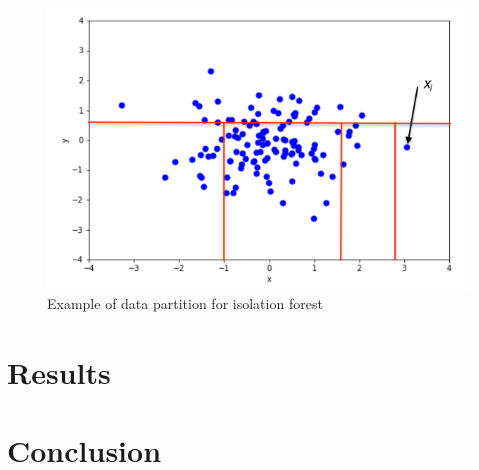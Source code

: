 \documentclass{article}
\begin{document}
\begin{figure}[ht]
    \centering
    \includegraphics[width=.7\textwidth]{../Isolating_an_Anomalous_Point.png}
    \caption{Example of data partition for isolation forest}
    \label{fig:iso_fig}
\end{figure}

\section{Results}


\section{Conclusion}
\end{document}
